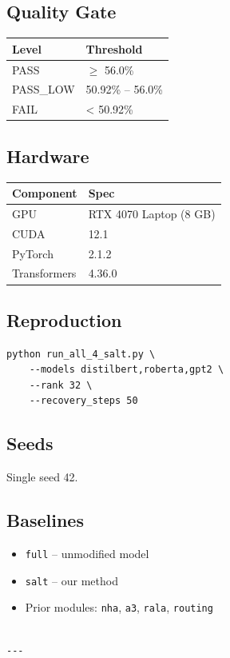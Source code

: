 \subsection{Quality Gate}

\begin{table}[H]
\centering
\small
\begin{tabular}{ll}
\toprule
\textbf{Level} & \textbf{Threshold} \\
\midrule
PASS & $\ge$ 56.0\% \\
PASS\_LOW & 50.92\% -- 56.0\% \\
FAIL & < 50.92\% \\
\bottomrule
\end{tabular}
\end{table}

\subsection{Hardware}

\begin{table}[H]
\centering
\small
\begin{tabular}{ll}
\toprule
\textbf{Component} & \textbf{Spec} \\
\midrule
GPU & RTX 4070 Laptop (8 GB) \\
CUDA & 12.1 \\
PyTorch & 2.1.2 \\
Transformers & 4.36.0 \\
\bottomrule
\end{tabular}
\end{table}

\subsection{Reproduction}

\begin{lstlisting}
python run_all_4_salt.py \
    --models distilbert,roberta,gpt2 \
    --rank 32 \
    --recovery_steps 50
\end{lstlisting}

\subsection{Seeds}

Single seed 42.

\subsection{Baselines}

\begin{itemize}
\item \texttt{full} -- unmodified model
\item \texttt{salt} -- our method
\item Prior modules: \texttt{nha}, \texttt{a3}, \texttt{rala}, \texttt{routing}
\end{itemize}
\begin{lstlisting}

---
\end{lstlisting}